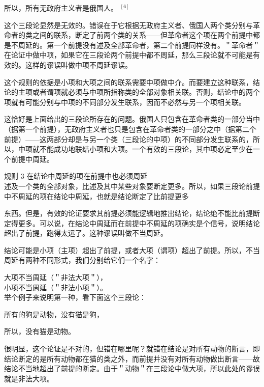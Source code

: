 \begin{displayquote}
所以，所有无政府主义者是俄国人。 ${ }^{[6]}$
\end{displayquote}

这个三段论显然是无效的。错误在于它根据无政府主义者、俄国人两个类分别与革命者的类之间的联系，断定了前两个类的关系——但革命者这个项在两个前提中都是不周延的。第一个前提没有述及全部革命者，第二个前提同样没有。＂革命者＂在论证中做中项，如果它在三段论两个前提中都不周延，那么三段论就不可能是有效的。这样的谬误叫做中项不周延谬误。

这个规则的依据是小项和大项之间的联系需要中项做中介。而要建立这种联系，结论的主项或者谓项就必须与中项所指称类的全部对象相关联。否则，结论中的两个项就有可能分别与中项的不同部分发生联系，因而不必然与另一个项相关联。

这恰好是上面给出的三段论所存在的问题。俄国人只包含在革命者类的一部分当中（据第一个前提），无政府主义者也只是包含在革命者类的一部分之中（据第二个前提）——这两部分却是与另一个类（三段论的中项）的不同部分发生联系的，所以，中项就不能成功地联结小项和大项。一个有效的三段论，其中项必定至少在一个前提中周延。

规则 3 在结论中周延的项在前提中也必须周延\\
述及一个类的全部对象，比述及其中某些对象要断定更多。所以，如果三段论前提中不周延的项在结论中周延，也就是结论断定了比前提更多

东西。但是，有效的论证要求其前提必须能逻辑地推出结论，结论绝不能比前提断定得更多。可以说，在结论中周延而在前提中不周延的项确实是个信号，说明结论超出了前提，跑得太远了。这种谬误叫做不当周延。

结论可能是小项（主项）超出了前提，或者大项（谓项）超出了前提。所以，不当周延有两种不同形式，我们分别给它们一个名字：

大项不当周延（＂非法大项＂），\\
小项不当周延（＂非法小项＂）。\\
举个例子来说明第一种，看下面这个三段论：

\begin{displayquote}
所有的狗是动物，没有猫是狗，
\end{displayquote}

\begin{displayquote}
所以，没有猫是动物。
\end{displayquote}

很明显，这个论证是不对的，但错在哪里呢？就错在结论是对所有动物的断言，即结论断定的是所有动物都在猫的类之外，而前提并没有对所有动物做出断言——故结论不当地超出了前提的断定。由于＂动物＂在三段论中做大项，所以此处的谬误就是非法大项。

